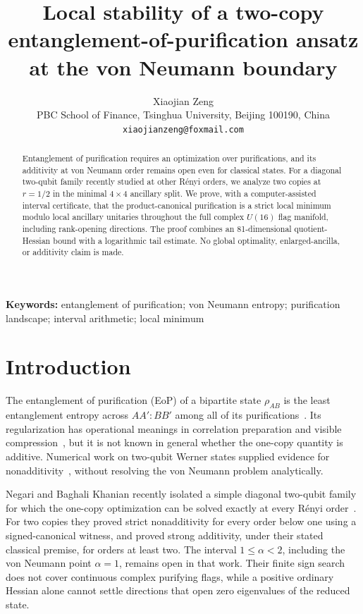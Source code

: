 \documentclass[11pt]{article}
\title{Local stability of a two-copy entanglement-of-purification ansatz at the von Neumann boundary}
\author{Xiaojian Zeng\\
\small PBC School of Finance, Tsinghua University, Beijing 100190, China\\
\small \texttt{xiaojianzeng@foxmail.com}}
\date{}
\begin{document}
\maketitle

\begin{abstract}
Entanglement of purification requires an optimization over purifications, and
its additivity at von Neumann order remains open even for classical states.
For a diagonal two-qubit family recently studied at other R\'enyi orders, we
analyze two copies at $r=1/2$ in the minimal $4\times4$ ancillary split.  We
prove, with a computer-assisted interval certificate, that the
product-canonical purification is a strict local minimum modulo local
ancillary unitaries throughout the full complex $U(16)$ flag manifold,
including rank-opening directions.  The proof combines an 81-dimensional
quotient-Hessian bound with a logarithmic tail estimate.  No global
optimality, enlarged-ancilla, or additivity claim is made.
\end{abstract}

\noindent\textbf{Keywords:} entanglement of purification; von Neumann entropy;
purification landscape; interval arithmetic; local minimum

\section{Introduction}

The entanglement of purification (EoP) of a bipartite state $\rho_{AB}$ is
the least entanglement entropy across $AA':BB'$ among all of its
purifications~\cite{Terhal2002}.  Its regularization has operational meanings
in correlation preparation and visible compression~\cite{Terhal2002,Hayashi2006},
but it is not known in general whether the one-copy quantity is additive.
Numerical work on two-qubit Werner states supplied evidence for
nonadditivity~\cite{ChenWinter2012}, without resolving the von Neumann
problem analytically.

Negari and Baghali Khanian recently isolated a simple diagonal two-qubit
family for which the one-copy optimization can be solved exactly at every
R\'enyi order~\cite{NegariKhanian2026}.  For two copies they proved strict
nonadditivity for every order below one using a signed-canonical witness, and
proved strong additivity, under their stated classical premise, for orders at
least two.  The interval $1\leq\alpha<2$, including the von Neumann point
$\alpha=1$, remains open in that work.  Their finite sign search does not
cover continuous complex purifying flags, while a positive ordinary Hessian
alone cannot settle directions that open zero eigenvalues of the reduced
state.
\end{document}
